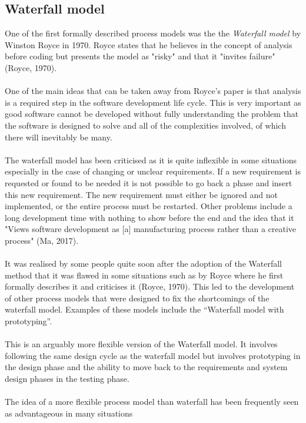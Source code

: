 \documentclass{CRPITStyle}
\begin{document}
	\subsection{Waterfall model}
		One of the first formally described process models was the the \textit{Waterfall model} by Winston Royce in 1970.
		Royce states that he believes in the concept of analysis before coding but presents the model as "risky" and that it
		"invites failure" (Royce, 1970).\\
		~\\
		One of the main ideas that can be taken away from Royce's paper is that analysis is a required step in the software development life cycle.
		This is very important as good software cannot be developed without fully understanding the problem that the software
		is designed to solve and all of the complexities involved, of which there will inevitably be many.\\
		~\\
		The waterfall model has been criticised as it is quite inflexible in some situations especially in the case of changing
		or unclear requirements. If a new requirement is requested or found to be needed it is not possible to go back a phase
		and insert this new requirement. The new requirement must either be ignored and not implemented, or the entire
		process must be restarted. Other problems include a long development time with nothing to show before the end and
		the idea that it "Views software development as [a] manufacturing process rather than a creative process" (Ma, 2017).\\
		~\\
		It was realised by some people quite soon after the adoption of the Waterfall method that it was flawed in some 
		situations such as by Royce where he first formally describes it and criticises it (Royce, 1970). This led to the
		development of other process models that were designed to fix the shortcomings of the waterfall model. Examples of
		these models include the ``Waterfall model with prototyping''. \\
		~\\
		 This is an arguably more flexible version of the Waterfall model. It involves following the same
		 design cycle as the waterfall model but involves prototyping in the design phase
		and the ability to move back to the requirements and system design phases in the testing phase.\\
		~\\
		The idea of a more flexible process model than waterfall has been frequently seen as advantageous in many situations
\end{document}

